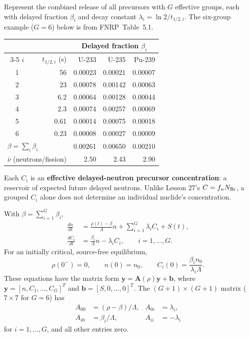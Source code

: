 \documentclass[compact]{ne630handout}
\begin{document}
\begin{handoutflow}
\vspace{5pt}

Represent the combined release of all precursors
with $G$ effective groups, each with delayed fraction $\beta_i$ and
decay constant $\lambda_i=\ln2/t_{1/2,i}$.
The six-group example ($G=6$) below is from FNRP~Table~5.1.

\begin{center}
{\fontsize{8}{9.5}\selectfont
\setlength{\tabcolsep}{4pt}
\begin{tabular}{crrrr}
\toprule
 & & \multicolumn{3}{c}{\textbf{Delayed fraction $\beta_i$}}\\
\cmidrule(lr){3-5}
$i$ & $t_{1/2,i}$ (s) & U-233 & U-235 & Pu-239\\
\midrule
1 & 56   & 0.00023 & 0.00021 & 0.00007\\
2 & 23   & 0.00078 & 0.00142 & 0.00063\\
3 & 6.2  & 0.00064 & 0.00128 & 0.00044\\
4 & 2.3  & 0.00074 & 0.00257 & 0.00069\\
5 & 0.61 & 0.00014 & 0.00075 & 0.00018\\
6 & 0.23 & 0.00008 & 0.00027 & 0.00009\\
\midrule
\multicolumn{2}{l}{$\beta=\sum_i\beta_i$}
  & 0.00261 & 0.00650 & 0.00210\\
\multicolumn{2}{l}{$\bar\nu$ (neutrons/fission)}
  & 2.50 & 2.43 & 2.90\\
\bottomrule
\end{tabular}}
\end{center}
Each $C_i$ is an \textbf{effective delayed-neutron precursor concentration}:
a reservoir of expected future delayed neutrons.
Unlike Lesson 27's $C=f_nN_{\rm Br}$, a grouped $C_i$ alone does not
determine an individual nuclide's concentration.

\columnbreak


With $\beta=\sum_{i=1}^{G}\beta_i$,
\[
 \boxed{\begin{aligned}
 \frac{dn}{dt}&=\frac{\rho(t)-\beta}{\Lambda}n+
                 \sum_{i=1}^{G}\lambda_i C_i+S(t),\\
 \frac{dC_i}{dt}&=\frac{\beta_i}{\Lambda}n-\lambda_i C_i,
                       \qquad i=1,\ldots,G .
 \end{aligned}}
\]
For an initially critical, source-free equilibrium,
\[
 \rho(0^-)=0,\qquad n(0)=n_0,\qquad
 \boxed{C_i(0)=\frac{\beta_i n_0}{\lambda_i\Lambda}.}
\]
These equations have the matrix form
$\dot{\mathbf y}=\mathbf A(\rho)\mathbf y+\mathbf b$,
where $\mathbf y=[n,C_1,\ldots,C_G]^T$ and
$\mathbf b=[S,0,\ldots,0]^T$.
The $(G+1)\times(G+1)$ matrix ($7\times7$ for $G=6$) has
\[
 \begin{aligned}
 A_{00}&=(\rho-\beta)/\Lambda,& A_{0i}&=\lambda_i,\\
 A_{i0}&=\beta_i/\Lambda,& A_{ii}&=-\lambda_i
 \end{aligned}
\]
for $i=1,\ldots,G$, and all other entries zero.


\end{handoutflow}
\end{document}
